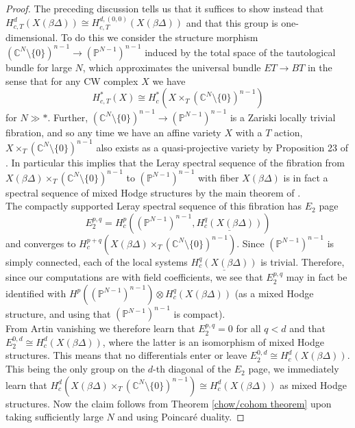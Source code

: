 \documentclass[11pt]{amsart}
\theoremstyle{definition}
\theoremstyle{remark}
\numberwithin{equation}{section}
\begin{document}
\begin{proof}
    The preceding discussion tells us that it suffices to show instead that $H_{c, T}^d(X(\beta \Delta)) \cong H_{c, T}^{d, (0, 0)}(X(\beta \Delta))$ and that this group is one-dimensional. To do this we consider the structure morphism $(\mathbb{C}^N \setminus \{0\})^{n - 1} \rightarrow (\mathbb{P}^{N-1})^{n - 1}$ induced by the total space of the tautological bundle for large $N$, which approximates the universal bundle $ET \rightarrow BT$ in the sense that for any CW complex $X$ we have  \begin{equation}
        H^*_{c, T}(X) \cong H^*_c(X \times _T (\mathbb{C}^N \setminus \{0\})^{n - 1})
    \end{equation} for $N \gg *$. Further, $(\mathbb{C}^N \setminus \{0\})^{n - 1} \rightarrow (\mathbb{P}^{N-1})^{n - 1}$ is a Zariski locally trivial fibration, and so any time we have an affine variety $X$ with a $T$ action, $X \times_T (\mathbb{C}^N \setminus \{0\})^{n - 1}$ also exists as a quasi-projective variety by Proposition 23 of \cite{MR1614555}. In particular this implies that the Leray spectral sequence of the fibration from $X(\beta \Delta) \times_T (\mathbb{C}^N \setminus \{0\})^{n - 1}$ to $(\mathbb{P}^{N-1})^{n-1}$ with fiber $X(\beta \Delta)$ is in fact a spectral sequence of mixed Hodge structures by the main theorem of \cite{MR2178703}.\\

   The compactly supported Leray spectral sequence of this fibration has $E_2$ page \begin{equation}
        E_2^{p, q} = H^p_c((\mathbb{P}^{N-1})^{n-1}, \underline{H^q_c(X(\beta \Delta))})
    \end{equation} and converges to $H^{p + q}_c(X(\beta \Delta) \times_T (\mathbb{C}^N \setminus \{0\})^{n - 1})$. Since $(\mathbb{P}^{N-1})^{n-1}$ is simply connected, each of the local systems $\underline{H^q_c(X(\beta \Delta))}$ is trivial. Therefore, since our computations are with field coefficients, we see that $E_2^{p, q}$ may in fact be identified with $H^p((\mathbb{P}^{N-1})^{n-1}) \otimes H_c^q(X(\beta \Delta))$ (as a mixed Hodge structure, and using that $(\mathbb{P}^{N-1})^{n-1}$ is compact).\\

    From Artin vanishing we therefore learn that $E_2^{p,q} = 0$ for all $q < d$ and that $E_2^{0, d} \cong H^{d}_c(X(\beta \Delta))$, where the latter is an isomorphism of mixed Hodge structures. This means that no differentials enter or leave $E_2^{0, d} \cong H^{d}_c(X(\beta \Delta))$. This being the only group on the $d$-th diagonal of the $E_2$ page, we immediately learn that $H_c^d(X(\beta \Delta) \times_T (\mathbb
    C^N \setminus \{0\})^{n-1}) \cong H^{d}_c(X(\beta \Delta))$ as mixed Hodge structures. Now the claim follows from Theorem \ref{chow/cohom theorem} upon taking sufficiently large $N$ and using Poincar\'e duality.
    \end{proof}
\end{document}
